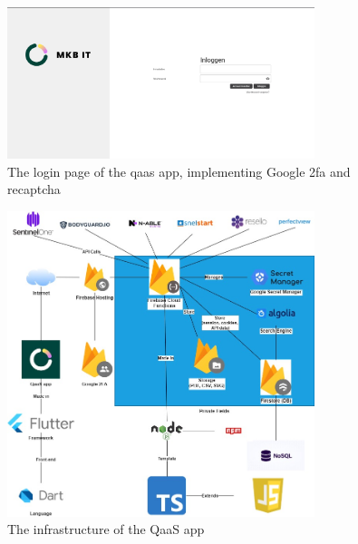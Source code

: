 \begin{figure}[htbp]
      \centering
      \includegraphics[width=0.8\textwidth]{Figures/Qaas App/Landing Page.png}
      \caption{The login page of the \acrshort{qaas} app, implementing Google \acrshort{2fa} and re\acrshort{captcha}}
\end{figure}

\begin{figure}[htbp]
      \centering
      \includegraphics[width=0.8\textwidth]{Figures/QaaS App Infraastructure.jpg}
      \caption{The infrastructure of the QaaS app}
\end{figure}

